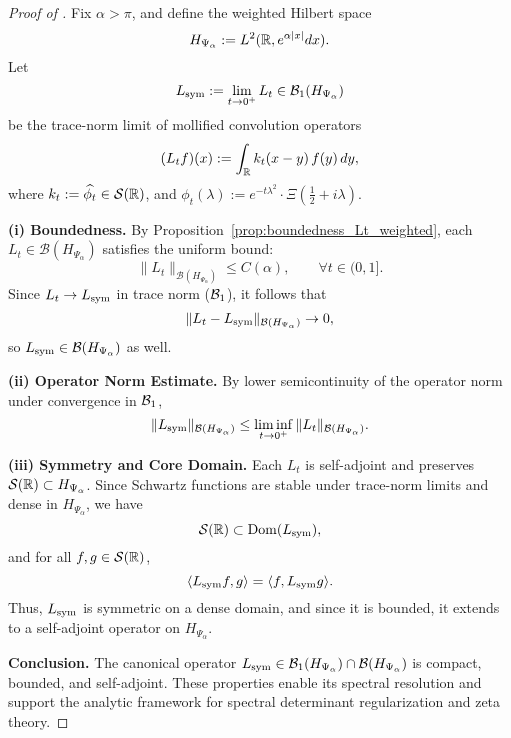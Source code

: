 \begin{proof}[Proof of ]
Fix \( \alpha > \pi \), and define the weighted Hilbert space
\[
H_{\Psi_\alpha} := L^2(\mathbb{R}, e^{\alpha |x|} dx).
\]
Let
\[
L_{\mathrm{sym}} := \lim_{t \to 0^+} L_t \in \mathcal{B}_1(H_{\Psi_\alpha})
\]
be the trace-norm limit of mollified convolution operators
\[
(L_t f)(x) := \int_{\mathbb{R}} k_t(x - y)\, f(y)\, dy,
\]
where \( k_t := \widehat{\phi_t} \in \mathcal{S}(\mathbb{R}) \), and \( \phi_t(\lambda) := e^{-t\lambda^2} \cdot \Xi\left( \tfrac{1}{2} + i\lambda \right) \).

\smallskip
\noindent\textbf{(i) Boundedness.}  
By Proposition~\ref{prop:boundedness_Lt_weighted}, each \( L_t \in \mathcal{B}(H_{\Psi_\alpha}) \) satisfies the uniform bound:
\[
\| L_t \|_{\mathcal{B}(H_{\Psi_\alpha})} \le C(\alpha), \qquad \forall t \in (0,1].
\]
Since \( L_t \to L_{\mathrm{sym}} \) in trace norm (\( \mathcal{B}_1 \)), it follows that
\[
\| L_t - L_{\mathrm{sym}} \|_{\mathcal{B}(H_{\Psi_\alpha})} \to 0,
\]
so \( L_{\mathrm{sym}} \in \mathcal{B}(H_{\Psi_\alpha}) \) as well.

\smallskip
\noindent\textbf{(ii) Operator Norm Estimate.}  
By lower semicontinuity of the operator norm under convergence in \( \mathcal{B}_1 \),
\[
\| L_{\mathrm{sym}} \|_{\mathcal{B}(H_{\Psi_\alpha})} \le \liminf_{t \to 0^+} \| L_t \|_{\mathcal{B}(H_{\Psi_\alpha})}.
\]

\smallskip
\noindent\textbf{(iii) Symmetry and Core Domain.}  
Each \( L_t \) is self-adjoint and preserves \( \mathcal{S}(\mathbb{R}) \subset H_{\Psi_\alpha} \). Since Schwartz functions are stable under trace-norm limits and dense in \( H_{\Psi_\alpha} \), we have
\[
\mathcal{S}(\mathbb{R}) \subset \operatorname{Dom}(L_{\mathrm{sym}}),
\]
and for all \( f, g \in \mathcal{S}(\mathbb{R}) \),
\[
\langle L_{\mathrm{sym}} f, g \rangle = \langle f, L_{\mathrm{sym}} g \rangle.
\]
Thus, \( L_{\mathrm{sym}} \) is symmetric on a dense domain, and since it is bounded, it extends to a self-adjoint operator on \( H_{\Psi_\alpha} \).

\smallskip
\noindent\textbf{Conclusion.}  
The canonical operator \( L_{\mathrm{sym}} \in \mathcal{B}_1(H_{\Psi_\alpha}) \cap \mathcal{B}(H_{\Psi_\alpha}) \) is compact, bounded, and self-adjoint. These properties enable its spectral resolution and support the analytic framework for spectral determinant regularization and zeta theory.
\end{proof}
